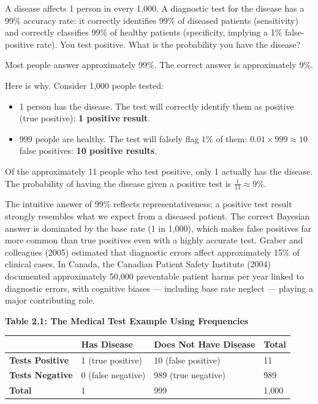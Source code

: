 \documentclass[12pt, letterpaper]{article}
\begin{document}
A disease affects 1 person in every 1,000. A diagnostic test for the disease has a 99\% accuracy rate: it correctly identifies 99\% of diseased patients (sensitivity) and correctly classifies 99\% of healthy patients (specificity, implying a 1\% false-positive rate). You test positive. What is the probability you have the disease?

Most people answer approximately 99\%. The correct answer is approximately 9\%.

Here is why. Consider 1,000 people tested:
\begin{itemize}
\item 1 person has the disease. The test will correctly identify them as positive (true positive): \textbf{1 positive result}.
\item 999 people are healthy. The test will falsely flag $1\%$ of them: $0.01 \times 999 \approx 10$ false positives: \textbf{10 positive results}.
\end{itemize}

Of the approximately 11 people who test positive, only 1 actually has the disease. The probability of having the disease given a positive test is $\frac{1}{11} \approx 9\%$.

The intuitive answer of 99\% reflects representativeness: a positive test result strongly resembles what we expect from a diseased patient. The correct Bayesian answer is dominated by the base rate (1 in 1,000), which makes false positives far more common than true positives even with a highly accurate test. Graber and colleagues (2005) estimated that diagnostic errors affect approximately 15\% of clinical cases. In Canada, the Canadian Patient Safety Institute (2004) documented approximately 50,000 preventable patient harms per year linked to diagnostic errors, with cognitive biases --- including base rate neglect --- playing a major contributing role.

\textbf{Table 2.1: The Medical Test Example Using Frequencies}


\begin{table}[H]
\centering
\small
\begin{tabularx}{\linewidth}{lYYY}
\toprule
 & Has Disease & Does Not Have Disease & Total \\
\midrule
\textbf{Tests Positive} & 1 (true positive) & 10 (false positive) & 11 \\
\textbf{Tests Negative} & 0 (false negative) & 989 (true negative) & 989 \\
\textbf{Total} & 1 & 999 & 1,000 \\
\bottomrule
\end{tabularx}
\end{table}
\end{document}
